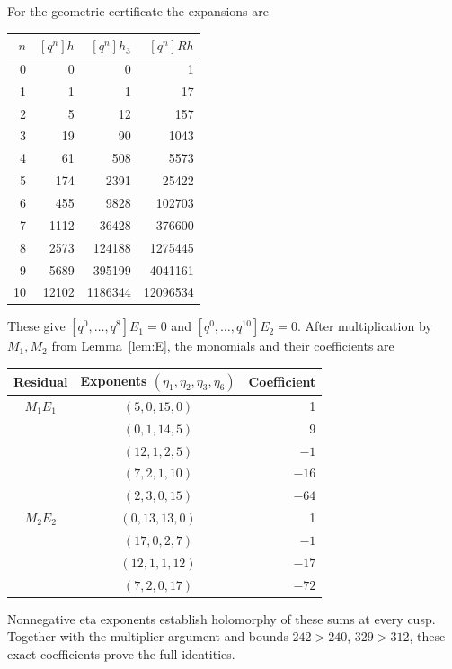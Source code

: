 \documentclass[11pt,a4paper]{article}
\theoremstyle{remark}\newtheorem{remark}[theorem]{Remark}
\begin{document}
For the geometric certificate the expansions are
\begin{center}\small
\begin{tabular}{r r r r}
\toprule
$n$&$[q^n]h$&$[q^n]h_3$&$[q^n]Rh$\\\midrule
0&0&0&1\\
1&1&1&17\\
2&5&12&157\\
3&19&90&1043\\
4&61&508&5573\\
5&174&2391&25422\\
6&455&9828&102703\\
7&1112&36428&376600\\
8&2573&124188&1275445\\
9&5689&395199&4041161\\
10&12102&1186344&12096534\\\bottomrule
\end{tabular}
\end{center}
These give $[q^0,\ldots,q^8]E_1=0$ and
$[q^0,\ldots,q^{10}]E_2=0$.
After multiplication by $M_1,M_2$ from Lemma~\ref{lem:E}, the monomials
and their coefficients are
\begin{center}\small
\begin{tabular}{c c r}
\toprule
Residual&Exponents $(\eta_1,\eta_2,\eta_3,\eta_6)$&Coefficient\\\midrule
$M_1E_1$&$(5,0,15,0)$&1\\
&$(0,1,14,5)$&9\\
&$(12,1,2,5)$&$-1$\\
&$(7,2,1,10)$&$-16$\\
&$(2,3,0,15)$&$-64$\\\midrule
$M_2E_2$&$(0,13,13,0)$&1\\
&$(17,0,2,7)$&$-1$\\
&$(12,1,1,12)$&$-17$\\
&$(7,2,0,17)$&$-72$\\\bottomrule
\end{tabular}
\end{center}
Nonnegative eta exponents establish holomorphy of these sums at every
cusp. Together with the multiplier argument and bounds $242>240$,
$329>312$, these exact coefficients prove the full identities.
\end{document}
